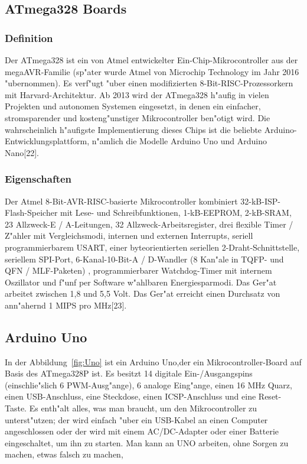 \subsection{ATmega328 Boards}
\subsubsection{Definition}

Der ATmega328 ist ein von Atmel entwickelter Ein-Chip-Mikrocontroller 
aus der megaAVR-Familie (sp"ater wurde Atmel von Microchip Technology 
im Jahr 2016 "ubernommen). Es verf"ugt "uber einen modifizierten 
8-Bit-RISC-Prozessorkern mit Harvard-Architektur.
Ab 2013 wird der ATmega328 h"aufig in vielen Projekten und autonomen 
Systemen eingesetzt, in denen ein einfacher, 
stromsparender und kosteng"unstiger Mikrocontroller ben"otigt wird. 
Die wahrscheinlich h"aufigste Implementierung dieses Chips ist die 
beliebte Arduino-Entwicklungsplattform, n"amlich die Modelle Arduino 
Uno und Arduino Nano[22].

\subsubsection{Eigenschaften}
Der Atmel 8-Bit-AVR-RISC-basierte Mikrocontroller kombiniert 
32-kB-ISP-Flash-Speicher mit Lese- und Schreibfunktionen, 
1-kB-EEPROM, 2-kB-SRAM, 23 Allzweck-E / A-Leitungen, 32 
Allzweck-Arbeitsregister, drei flexible Timer / Z"ahler mit 
Vergleichsmodi, internen und externen Interrupts, seriell 
programmierbarem USART, einer byteorientierten seriellen 
2-Draht-Schnittstelle, seriellem SPI-Port, 6-Kanal-10-Bit-A / D-Wandler 
(8 Kan"ale in TQFP- und QFN / MLF-Paketen) , programmierbarer Watchdog-Timer mit 
internem Oszillator und f"unf per Software w"ahlbaren Energiesparmodi. 
Das Ger"at arbeitet zwischen 1,8 und 5,5 Volt. Das Ger"at erreicht 
einen Durchsatz von ann"ahernd 1 MIPS pro MHz[23].




\subsection{Arduino Uno}

In der Abbildung~\ref{fig:Uno} ist ein Arduino Uno,der ein Mikrocontroller-Board auf Basis des ATmega328P ist. 
Es besitzt 14 digitale Ein-/Ausgangspins 
(einschlie"slich 6 PWM-Ausg"ange), 6 analoge Eing"ange, 
einen 16 MHz Quarz, einen USB-Anschluss, eine Steckdose, 
einen ICSP-Anschluss und eine Reset-Taste. Es enth"alt alles, 
was man braucht, um den Mikrocontroller zu unterst"utzen; 
der wird einfach "uber ein USB-Kabel an einen Computer 
angeschlossen oder der wird  mit einem AC/DC-Adapter oder einer 
Batterie eingeschaltet, um  ihn zu starten. Man kann an UNO arbeiten, 
ohne  Sorgen zu machen, etwas falsch zu machen, 


